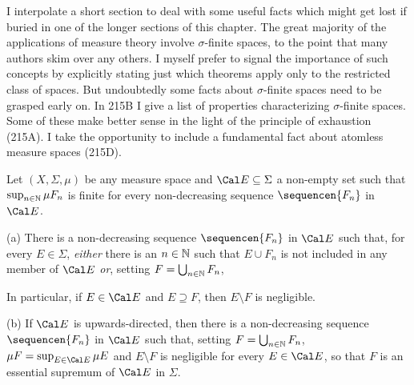       
\def\chaptername{Taxonomy of measure spaces} 
\def\sectionname{$\sigma$-finite spaces and the principle of exhaustion} 
      
      
I interpolate a short section to deal with some useful facts which might 
get lost if buried in one of the longer sections of this chapter.   The 
great majority of the applications of measure theory involve 
$\sigma$-finite spaces, to the point that many authors skim over any 
others.   I 
myself prefer to signal the importance of such concepts by explicitly 
stating just which theorems apply only to the restricted class of 
spaces.   But undoubtedly some facts about $\sigma$-finite spaces need 
to be grasped early on.   In 215B I give a list of properties 
characterizing $\sigma$-finite spaces.   Some of these make better sense 
in the light of the principle of exhaustion (215A).   I take the 
opportunity to include a fundamental fact about atomless measure spaces 
(215D). 
      
 Let $(X,\Sigma,\mu)$ be any measure space and 
$\Cal E\subseteq\Sigma$ a non-empty set such that 
$\sup_{n\in\Bbb N}\mu F_n$ is finite for every non-decreasing sequence 
$\sequencen{F_n}$ in $\Cal E$. 
      
(a) There is a 
non-decreasing sequence $\sequencen{F_n}$ in $\Cal E$ such that, for 
every $E\in\Sigma$, {\it either} there is an $n\in\Bbb N$ such that 
$E\cup F_n$ is not included in any member of $\Cal E$ {\it or}, setting 
$F=\bigcup_{n\in\Bbb N}F_n$, 
      
      
\noindent In particular, if $E\in\Cal E$ and 
$E\supseteq F$, then 
$E\setminus F$ is negligible. 
      
(b) If $\Cal E$ is upwards-directed, then there is a non-decreasing 
sequence $\sequencen{F_n}$ in $\Cal E$ such that, setting 
$F=\bigcup_{n\in\Bbb N}F_n$, $\mu F=\sup_{E\in\Cal E}\mu E$ and 
$E\setminus F$ is negligible for every $E\in\Cal E$, so that $F$ is an 
essential supremum of $\Cal E$ in $\Sigma$. 
      
